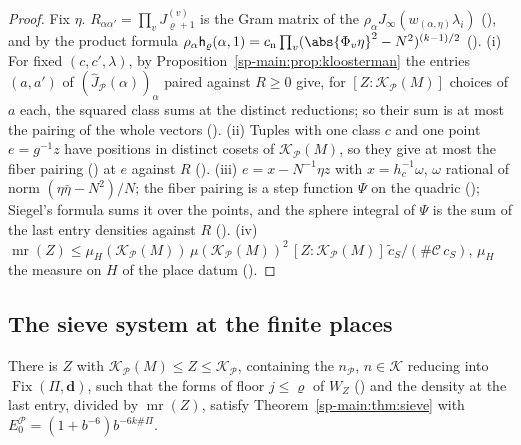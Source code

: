\begin{proof}
Fix $\eta$. $R_{\alpha\alpha'}=\prod_vJ^{(v)}_{\varrho+1}$ is the Gram matrix of the
$\rho_\alpha J_\infty(w_{(\alpha,\eta)}\lambda_i)$ (), and by
the product formula $\rho_\alpha\mathsf h_\varrho(\alpha,1)=c_{\mathrm n}\prod_v(\abs{\Phi_v\eta}^2-N^2)^{(k-1)/2}$
(). (i) For fixed $(c,c',\lambda)$, by
Proposition~\ref{sp-main:prop:kloosterman} the entries $(a,a')$ of $(\hat J_{\mathcal P}(\alpha))_\alpha$
paired against $R\ge0$ give, for $[Z:\mathcal K_{\mathcal P}(M)]$ choices of $a$ each, the squared class sums at
the distinct reductions; so their sum is at most the pairing of the whole vectors ().
(ii) Tuples with one class $c$ and one point $e=g^{-1}z$ have positions in distinct cosets of $\mathcal
K_{\mathcal P}(M)$, so they give at most the fiber pairing () at $e$ against $R$
(). (iii)
$e=x-N^{-1}\eta z$ with $x=h_c^{-1}\omega$, $\omega$ rational of norm $(\eta\bar\eta-N^2)/N$; the fiber pairing
is a step function $\Psi$ on the quadric ();
Siegel's formula sums it over the points, and the sphere integral of $\Psi$ is the sum of the last entry
densities against $R$ ().
(iv) $\operatorname{mr}(Z)\le\mu_H(\mathcal K_{\mathcal P}(M))\,\mu(\mathcal K_{\mathcal P}(M))^2\,[Z:\mathcal K_{\mathcal P}(M)]\,
\tilde c_S/(\#\mathcal C\,c_S)$, $\mu_H$ the measure on $H$ of the place datum
().
\end{proof}

\subsection{The sieve system at the finite places}\label{sp-main:ss:finite}

\begin{proposition}
\label{sp-main:prop:finite}
There is $Z$ with $\mathcal K_{\mathcal P}(M)\le Z\le\mathcal K_{\mathcal P}$, containing the $n_{\mathcal P}$,
$n\in\mathcal K$ reducing into $\operatorname{Fix}(\Pi,\mathbf d)$, such that the forms of floor $j\le\varrho$ of
$W_Z$ () and the density at the last entry, divided by
$\operatorname{mr}(Z)$, satisfy Theorem~\ref{sp-main:thm:sieve} with
$E^{\mathcal P}_0=(1+b^{-6})b^{-6k\#\Pi}$.
\end{proposition}

